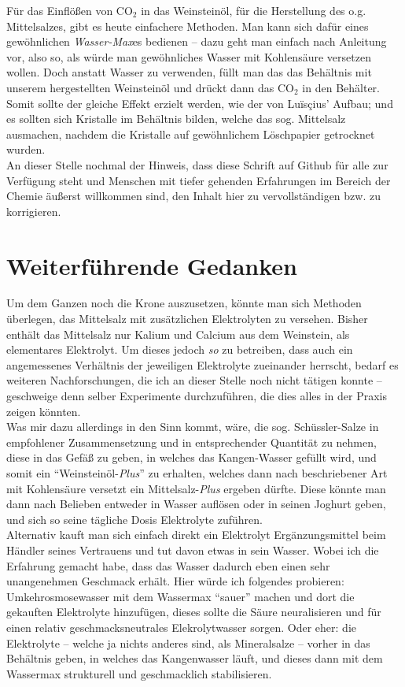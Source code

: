 \documentclass[a5paper,8pt]{scrbook}
\begin{document}
Für das Einflößen von CO$_2$ in das Weinsteinöl, für die Herstellung des o.g. Mittelsalzes, gibt es heute einfachere Methoden. Man kann sich dafür eines gewöhnlichen \emph{Wasser-Max}es bedienen -- dazu geht man einfach nach Anleitung vor, also so, als würde man gewöhnliches Wasser mit Kohlensäure versetzen wollen. Doch anstatt Wasser zu verwenden, füllt man das das Behältnis mit unserem hergestellten Weinsteinöl und drückt dann das CO$_2$ in den Behälter. Somit sollte der gleiche Effekt erzielt werden, wie der von Luïsçius' Aufbau; und es sollten sich Kristalle im Behältnis bilden, welche das sog. Mittelsalz ausmachen, nachdem die Kristalle auf gewöhnlichem Löschpapier getrocknet wurden.\\

An dieser Stelle nochmal der Hinweis, dass diese Schrift auf Github für alle zur Verfügung steht und Menschen mit tiefer gehenden Erfahrungen im Bereich der Chemie äußerst willkommen sind, den Inhalt hier zu vervollständigen bzw. zu korrigieren.

\newpage

\section{Weiterführende Gedanken}

Um dem Ganzen noch die Krone auszusetzen, könnte man sich Methoden überlegen, das Mittelsalz mit zusätzlichen Elektrolyten zu versehen. Bisher enthält das Mittelsalz nur Kalium und Calcium aus dem Weinstein, als elementares Elektrolyt. Um dieses jedoch \emph{so} zu betreiben, dass auch ein angemessenes Verhältnis der jeweiligen Elektrolyte zueinander herrscht, bedarf es weiteren Nachforschungen, die ich an dieser Stelle noch nicht tätigen konnte -- geschweige denn selber Experimente durchzuführen, die dies alles in der Praxis zeigen könnten.\\

Was mir dazu allerdings in den Sinn kommt, wäre, die sog. Schüssler-Salze in empfohlener Zusammensetzung und in entsprechender Quantität zu nehmen, diese in das Gefäß zu geben, in welches das Kangen-Wasser gefüllt wird, und somit ein ``Weinsteinöl-\emph{Plus}'' zu erhalten, welches dann nach beschriebener Art mit Kohlensäure versetzt ein Mittelsalz-\emph{Plus} ergeben dürfte. Diese könnte man dann nach Belieben entweder in Wasser auflösen oder in seinen Joghurt geben, und sich so seine tägliche Dosis Elektrolyte zuführen.\\

Alternativ kauft man sich einfach direkt ein Elektrolyt Ergänzungsmittel beim Händler seines Vertrauens und tut davon etwas in sein Wasser. Wobei ich die Erfahrung gemacht habe, dass das Wasser dadurch eben einen sehr unangenehmen Geschmack erhält. Hier würde ich folgendes probieren: Umkehrosmosewasser mit dem Wassermax ``sauer'' machen und dort die gekauften Elektrolyte hinzufügen, dieses sollte die Säure neuralisieren und für einen relativ geschmacksneutrales Elekrolytwasser sorgen. Oder eher: die Elektrolyte -- welche ja nichts anderes sind, als Mineralsalze -- vorher in das Behältnis geben, in welches das Kangenwasser läuft, und dieses dann mit dem Wassermax strukturell und geschmacklich stabilisieren.\\
\end{document}
